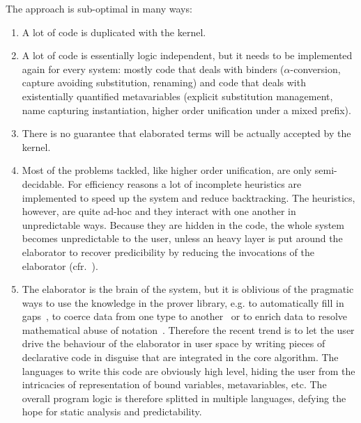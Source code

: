 \documentclass{easychair}
\begin{document}
The approach is sub-optimal in many ways:
\begin{enumerate}
\item A lot of code is duplicated with the kernel.
\item A lot of code is essentially logic independent, but it needs to
	be implemented again for every system: mostly code that deals
	with binders ($\alpha$-conversion, capture avoiding
	substitution, renaming) and code that deals with existentially
	quantified metavariables (explicit substitution management,
	name capturing instantiation, higher order unification under a
	mixed prefix).
\item There is no guarantee that elaborated terms will be actually
	accepted by the kernel.
\item Most of the problems tackled, like higher order unification, are
	only semi-decidable. For efficiency reasons a lot of
	incomplete heuristics are implemented to speed up the system
	and reduce backtracking. The heuristics, however, are quite
	ad-hoc and they interact with one another in unpredictable
	ways. Because they are hidden in the code, the whole system
	becomes unpredictable to the user, unless an heavy layer is
	put around the elaborator to recover predicibility by reducing
	the invocations of the elaborator (cfr.~\cite{SOZEAU?}).
\item The elaborator is the brain of the system, but it is oblivious
	of the pragmatic ways to use the knowledge in the prover
	library, e.g. to automatically fill in
	gaps~\cite{mathcomponents}, to coerce data from one type to
	another~\cite{coercivesubtyping} or to enrich data to resolve
	mathematical abuse of
	notation~\cite{nonuniformunificationhints}. Therefore the
	recent trend is to let the user drive the behaviour of the
	elaborator in user space by writing pieces of declarative code
	in disguise that are integrated in the core algorithm. The
	languages to write this code are obviously high level, hiding
	the user from the intricacies of representation of bound
	variables, metavariables, etc. The overall program logic is
	therefore splitted in multiple languages, defying the hope for
	static analysis and predictability.
\end{enumerate}
\end{document}
